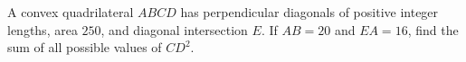 A convex quadrilateral $ABCD$ has perpendicular diagonals of positive integer lengths, area $250$, and diagonal intersection $E$. If $AB=20$ and $EA=16$, find the sum of all possible values of $CD^2$.
